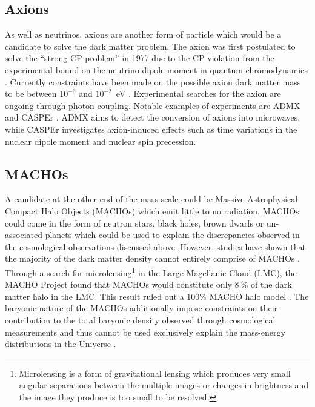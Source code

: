 \subsection{Axions}\label{sec:DMOverview/Axions}
As well as neutrinos, axions are another form of particle which would be a candidate to solve the dark matter problem. The axion was first postulated to solve the ``strong CP problem'' in 1977 \cite{ConsvCP} due to the CP violation from the experimental bound on the neutrino dipole moment in quantum chromodynamics \cite{Hook:2018dlk}. Currently constraints have been made on the possible axion dark matter mass to be between $10^{-6}$ and $10^{-2}$~eV \cite{Duffy:2009ig}. Experimental searches for the axion are ongoing through photon coupling. Notable examples of experiments are ADMX \cite{ADMX:2018gho} and CASPEr \cite{JacksonKimball:2017elr}. ADMX aims to detect the conversion of axions into microwaves, while CASPEr investigates axion-induced effects such as time variations in the nuclear dipole moment and nuclear spin precession.

\subsection{MACHOs}\label{sec:DMOverview/MACHOs}
A candidate at the other end of the mass scale could be Massive Astrophysical Compact Halo Objects (MACHOs) which emit little to no radiation. MACHOs could come in the form of neutron stars, black
holes, brown dwarfs or un-associated planets which could be used to explain the discrepancies observed in the cosmological observations discussed above. However, studies have shown that the majority of the dark matter density cannot entirely comprise of MACHOs \cite{Becker:2004ni,MicroLens}. Through a search for microlensing\footnote{Microlensing is a form of gravitational lensing which produces very small angular separations between the multiple images or changes in brightness and the image they produce is too small to be resolved.} in the Large Magellanic Cloud (LMC), the MACHO Project found that MACHOs would constitute only $8~\%$ of the dark matter halo in the LMC. This result ruled out a $100\%$ MACHO halo model \cite{MicroLens}.
The baryonic nature of the MACHOs additionally impose constraints on their contribution to the total baryonic density observed through cosmological measurements and thus cannot be used exclusively explain the mass-energy distributions in the Universe \cite{Planck2018}.

